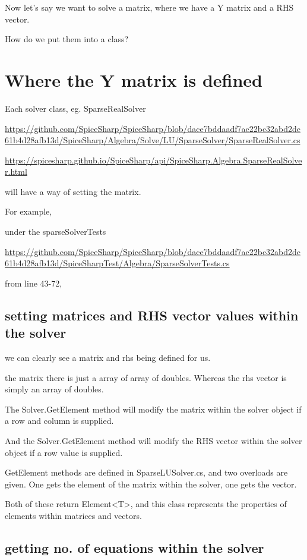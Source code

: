 \documentclass[12pt]{article}
\renewcommand{\_}{\kern-1.5pt\textunderscore\kern-1.5pt}
\begin{document}
Now let's say we want to solve a matrix, where we have a Y matrix and a RHS vector.

How do we put them into a class?

\section{Where the Y matrix is defined}

Each solver class, eg. SparseRealSolver

\url{https://github.com/SpiceSharp/SpiceSharp/blob/dace7bddaadf7ac22bc32abd2dc61b4d28afb13d/SpiceSharp/Algebra/Solve/LU/SparseSolver/SparseRealSolver.cs}

\url{https://spicesharp.github.io/SpiceSharp/api/SpiceSharp.Algebra.SparseRealSolver.html}

will have a way of setting the matrix.

For example,

under the sparseSolverTests

\url{https://github.com/SpiceSharp/SpiceSharp/blob/dace7bddaadf7ac22bc32abd2dc61b4d28afb13d/SpiceSharpTest/Algebra/SparseSolverTests.cs}

from line 43-72, 

\subsection{setting matrices and RHS vector values within the solver}

we can clearly see a matrix and rhs being defined for us.

the matrix there is just a array of array of doubles. Whereas the rhs vector is simply an array of doubles. 

The Solver.GetElement method will modify the matrix within the solver object if a row and column is supplied.

And the Solver.GetElement method will modify the RHS vector within the solver object if a row value is supplied.

GetElement methods are defined in SparseLUSolver.cs, and two overloads are given. One gets the element of the matrix within the solver, one gets the vector.

Both of these return Element<T>, and this class represents the properties of elements within matrices and vectors.

\subsection{getting no. of equations within the solver}
\end{document}
